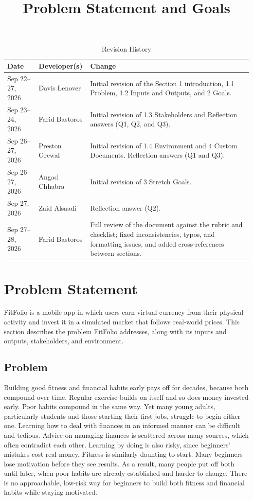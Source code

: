 \documentclass{article}
\title{Problem Statement and Goals\\\progname}
\author{\authname}
\date{}
\begin{document}
\maketitle

\begin{table}[hp]
\caption{Revision History} \label{TblRevisionHistory}
\begin{tabularx}{\textwidth}{llX}
\toprule
\textbf{Date} & \textbf{Developer(s)} & \textbf{Change}\\
\midrule
Sep 22--27, 2026 & Davis Lenover & Initial revision of the Section 1 introduction, 1.1 Problem, 1.2 Inputs and Outputs, and 2 Goals.\\
\addlinespace
Sep 23--24, 2026 & Farid Bastoros & Initial revision of 1.3 Stakeholders and Reflection answers (Q1, Q2, and Q3).\\
\addlinespace
Sep 26--27, 2026 & Preston Grewal & Initial revision of 1.4 Environment and 4 Custom Documents. Reflection answers (Q1 and Q3).\\
\addlinespace
Sep 26--27, 2026 & Angad Chhabra & Initial revision of 3 Stretch Goals.\\
\addlinespace
Sep 27, 2026 & Zaid Alsaadi & Reflection answer (Q2).\\
\addlinespace
Sep 27--28, 2026 & Farid Bastoros & Full review of the document against the rubric and checklist; fixed inconsistencies, typos, and formatting issues, and added cross-references between sections.\\
\bottomrule
\end{tabularx}
\end{table}

\section{Problem Statement}

FitFolio is a mobile app in which users earn virtual currency from their physical activity and invest it in a simulated market that follows real-world prices. This section describes the problem FitFolio addresses, along with its inputs and outputs, stakeholders, and environment.

\subsection{Problem}
Building good fitness and financial habits early pays off for decades, because
both compound over time. Regular exercise builds on itself and so does money
invested early. Poor habits compound in the same way. Yet many young adults,
particularly students and those starting their first jobs, struggle to begin
either one.
Learning how to deal with finances in an informed manner can be difficult and tedious. Advice on managing finances is scattered across many sources, which often contradict each other.
Learning by doing is also risky, since beginners' mistakes cost real money. Fitness is similarly daunting to start. Many beginners lose motivation before they see results.
As a result, many people put off both until later, when poor habits are already established and harder to change. There is no approachable, low-risk way for beginners to build both fitness and financial habits while staying motivated.
\end{document}
